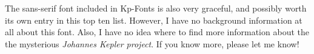 \documentclass{article}
\begin{document}
\frenchspacing

\noindent
\sf The sans-serif font included in Kp-Fonts is also very graceful, and
possibly worth its own entry in this top ten list.  However, I have no
background information at all about this font.  Also, I have no idea where
to find more information about the the mysterious \emph{Johannes Kepler
project}. If you know more, please let me know!
\end{document}
